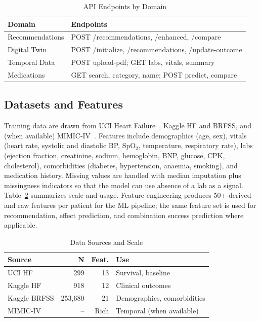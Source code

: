 \documentclass[conference]{IEEEtran}
\begin{document}
\begin{table}[t]
\caption{API Endpoints by Domain}
\label{tab:api}
\centering
\footnotesize
\begin{tabular}{@{}p{}p{}@{}}
\toprule
\textbf{Domain} & \textbf{Endpoints} \\
\midrule
Recommendations & POST /recommendations, /enhanced, /compare \\
Digital Twin & POST /initialize, /recommendations, /update-outcome \\
Temporal Data & POST upload-pdf; GET labs, vitals, summary \\
Medications & GET search, category, name; POST predict, compare \\
\bottomrule
\end{tabular}
\end{table}

\subsection{Datasets and Features}
Training data are drawn from UCI Heart Failure~\cite{chicco2020uci}, Kaggle HF and BRFSS, and (when available) MIMIC-IV~\cite{johnson2016mimic}. Features include demographics (age, sex), vitals (heart rate, systolic and diastolic BP, SpO$_2$, temperature, respiratory rate), labs (ejection fraction, creatinine, sodium, hemoglobin, BNP, glucose, CPK, cholesterol), comorbidities (diabetes, hypertension, anaemia, smoking), and medication history. Missing values are handled with median imputation plus missingness indicators so that the model can use absence of a lab as a signal. Table~\ref{tab:data} summarizes scale and usage. Feature engineering produces 50+ derived and raw features per patient for the ML pipeline; the same feature set is used for recommendation, effect prediction, and combination success prediction where applicable.

\begin{table}[t]
\caption{Data Sources and Scale}
\label{tab:data}
\centering
\footnotesize
\begin{tabular}{@{}p{}rrp{}@{}}
\toprule
\textbf{Source} & \textbf{N} & \textbf{Feat.} & \textbf{Use} \\
\midrule
UCI HF & 299 & 13 & Survival, baseline \\
Kaggle HF & 918 & 12 & Clinical outcomes \\
Kaggle BRFSS & 253,680 & 21 & Demographics, comorbidities \\
MIMIC-IV & -- & Rich & Temporal (when available) \\
\bottomrule
\end{tabular}
\end{table}
\end{document}
